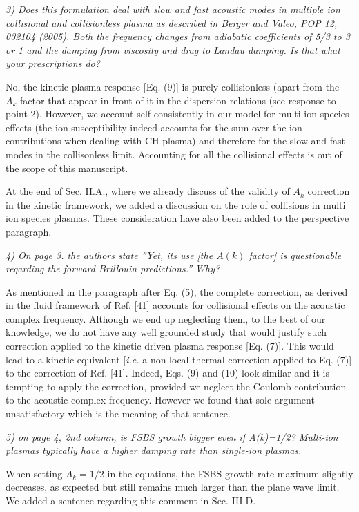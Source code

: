 \documentclass{article}
\begin{document}
\textit{
3)  Does this formulation deal with slow and fast acoustic modes in multiple ion collisional and collisionless plasma as described in Berger and Valeo, POP 12, 032104
(2005). Both the frequency changes from adiabatic coefficients of 5/3 to 3 or 1 and the
damping from viscosity and drag to Landau damping. Is that what your prescriptions
do?}

No, the kinetic plasma response [Eq. (9)] is purely collisionless (apart from the $A_k$ factor that appear in front of it in the dispersion relations (see response to point 2). However, we account self-consistently in our model for multi ion species effects (the ion susceptibility indeed accounts for the sum over the ion contributions when dealing with CH plasma) and therefore for the slow and fast modes in the collisonless limit. Accounting for all the collisional effects is out of the scope of this manuscript. 

At the end of Sec. II.A., where we already discuss of the validity of $A_k$ correction in the kinetic framework, 
we added a discussion  on the role of collisions in multi ion species plasmas. These consideration have also been added to the perspective paragraph. 

\textit{
4) On page 3. the authors state ”Yet, its use [the $A(k)$ factor] is questionable regarding
the forward Brillouin predictions.” Why?}

As mentioned in the paragraph after Eq. (5), the complete correction, as derived in the fluid framework of Ref. [41] accounts for collisional effects on the  acoustic complex frequency. Although we end up neglecting them, to the best of our knowledge, we do not have any well grounded  study that would justify such correction applied to the kinetic driven plasma response  [Eq. (7)]. This would  lead  to a  kinetic equivalent [\emph{i.e.} a non local thermal correction applied to Eq.  (7)] to the correction of Ref. [41]. 
Indeed, Eqs. (9) and (10) look similar and it is tempting to apply the correction, provided we neglect the Coulomb contribution to the acoustic complex frequency. However we found that sole argument unsatisfactory which is the meaning of that sentence. 

\textit{
5)  on page 4, 2nd column, is FSBS growth bigger even if A(k)=1/2? Multi-ion plasmas
typically have a higher damping rate than single-ion plasmas.}

When setting $A_k=1/2$ in the equations, the FSBS growth rate maximum slightly decreases, as expected but still remains much larger than the plane wave limit. We added a sentence regarding this comment in Sec. III.D.
\end{document}
